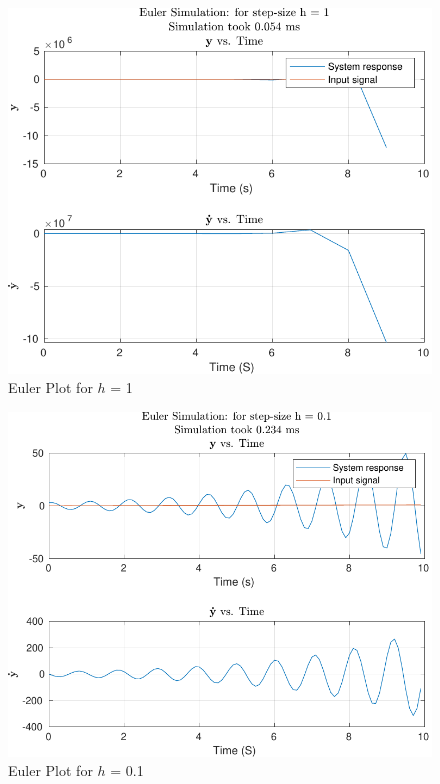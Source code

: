 \documentclass[12pt]{article}
\begin{document}
		\begin{figure}[H]
			\centering
			\includegraphics[width=1\linewidth]{"Code/Fig/Euler_plot_h_1.pdf"}
			\caption{Euler Plot for $h$ = 1}
			\label{fig:eulerploth1}
		\end{figure}	
		\begin{figure}[H]
			\centering
			\includegraphics[width=1\linewidth]{"Code/Fig/Euler_plot_h_0.1.pdf"}
			\caption{Euler Plot for $h$ = 0.1}
			\label{fig:eulerploth01}
		\end{figure}
\end{document}
